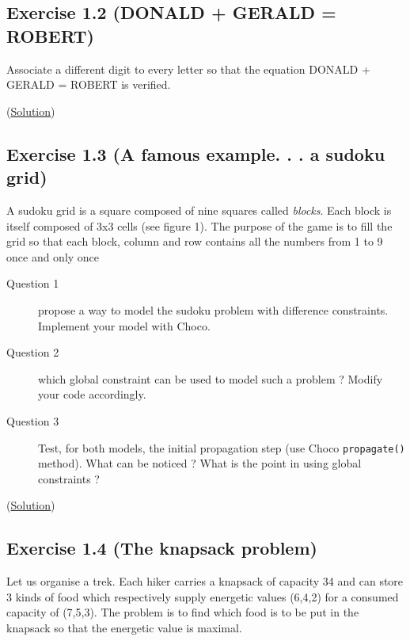 \subsection{Exercise 1.2 (DONALD +  GERALD = ROBERT)}\label{exercises:exercise1.2}\hypertarget{exercises:exercise1.2}{}
Associate a different digit to every letter so that the equation DONALD + GERALD = ROBERT is verified.

(\hyperlink{solutions:solutionofexercise1.2}{Solution})

\subsection{Exercise 1.3 (A famous example. . . a sudoku grid)}\label{exercises:exercise1.3}\hypertarget{exercises:exercise1.3}{}
A sudoku grid is a square composed of nine squares called \emph{blocks}. Each block is itself composed of 3x3 cells
(see figure 1). The purpose of the game is to fill the grid so that each block, column and row contains all the
numbers from 1 to 9 once and only once

\begin{description}
	\item[Question 1] propose a way to model the sudoku problem with difference constraints. Implement your model with Choco.
	\item[Question 2] which global constraint can be used to model such a problem ? Modify your code accordingly.
	\item[Question 3] Test, for both models, the initial propagation step (use Choco \texttt{propagate()} method). What can be noticed ? What is the point in using global constraints ?
\end{description}


(\hyperlink{solutions:solutionofexercise1.3}{Solution})

\subsection{Exercise 1.4 (The knapsack problem)}\label{exercises:exercise1.4}\hypertarget{exercises:exercise1.4}{}
Let us organise a trek. Each hiker carries a knapsack of capacity 34 and can store 3 kinds of food which respectively supply energetic values (6,4,2) for a consumed capacity of (7,5,3). The problem is to find which food is to be put in the knapsack so that the energetic value is maximal.

